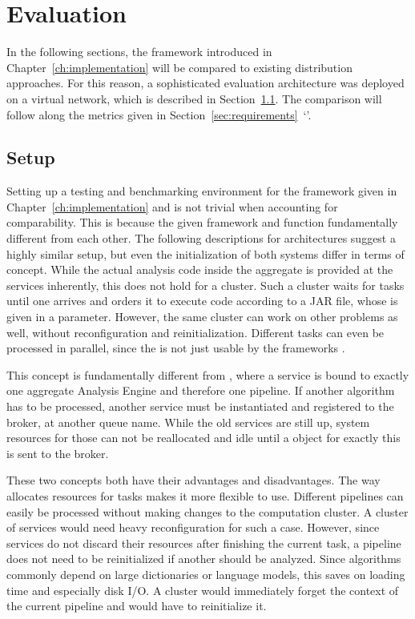 \chapter{Evaluation}
\label{ch:evaluation}
In the following sections, the framework introduced in Chapter~\ref{ch:implementation} will be compared to existing \uima{} distribution approaches. For this reason, a sophisticated evaluation architecture was deployed on a virtual network, which is described in Section~\ref{sec:setup}. The comparison will follow along the metrics given in Section~\ref{sec:requirements}~`'.


\section{Setup}
\label{sec:setup}

Setting up a testing and benchmarking environment for the framework given in Chapter~\ref{ch:implementation} and \uimaas{} is not trivial when accounting for comparability. This is because the given framework and \uimaas{} function fundamentally different from each other. The following descriptions for \docker{} architectures suggest a highly similar setup, but even the initialization of both systems differ in terms of concept. While the actual analysis code inside the aggregate \anen{} is provided at the \uimaas{} services inherently, this does not hold for a \spark{} cluster. Such a \spark{} cluster waits for tasks until one arrives and orders it to execute code according to a JAR file, whose \URL{} is given in a parameter. However, the same cluster can work on other problems as well, without reconfiguration and reinitialization. Different tasks can even be processed in parallel, since the \spark{} is not just usable by the frameworks \api{}.

This concept is fundamentally different from \uimaas{}, where a service is bound to exactly one aggregate Analysis Engine and therefore one pipeline. If another \nlp{} algorithm has to be processed, another \uimaas{} service must be instantiated and registered to the broker, at another queue name. While the old services are still up, system resources for those can not be reallocated and idle until a \cas{} object for exactly this \anen{} is sent to the broker. 

These two concepts both have their advantages and disadvantages. The way \spark{} allocates resources for tasks makes it more flexible to use. Different pipelines can easily be processed without making changes to the computation cluster. A cluster of \uimaas{} services would need heavy reconfiguration for such a case. However, since \uimaas{} services do not discard their resources after finishing the current task, a pipeline does not need to be reinitialized if another \cas{} should be analyzed. Since \nlp{} algorithms commonly depend on large dictionaries or language models, this saves on loading time and especially disk I/O. A \spark{} cluster would immediately forget the context of the current pipeline and would have to reinitialize it.

